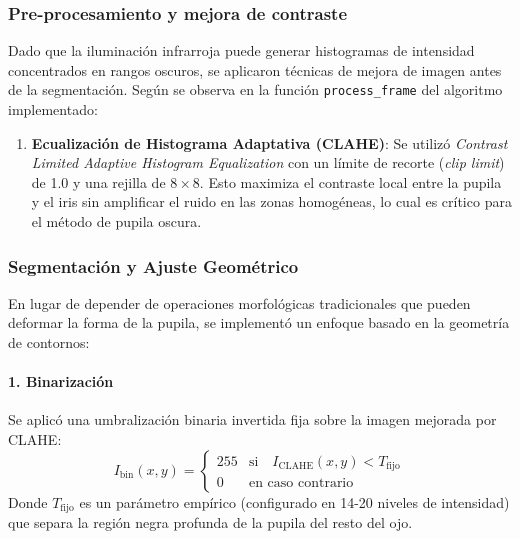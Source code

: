 \subsubsection{Pre-procesamiento y mejora de contraste}

Dado que la iluminación infrarroja puede generar histogramas de intensidad concentrados en rangos oscuros, se aplicaron técnicas de mejora de imagen antes de la segmentación.
Según se observa en la función \texttt{process\_frame} del algoritmo implementado:

\begin{enumerate}
	\item \textbf{Ecualización de Histograma Adaptativa (CLAHE)}: Se utilizó \textit{Contrast Limited Adaptive Histogram Equalization} con un límite de recorte (\textit{clip limit}) de 1.0 y una rejilla de $8 \times 8$.
	Esto maximiza el contraste local entre la pupila y el iris sin amplificar el ruido en las zonas homogéneas, lo cual es crítico para el método de pupila oscura.
\end{enumerate}

\subsubsection{Segmentación y Ajuste Geométrico}

En lugar de depender de operaciones morfológicas tradicionales que pueden deformar la forma de la pupila, se implementó un enfoque basado en la geometría de contornos:

\paragraph{1. Binarización}
Se aplicó una umbralización binaria invertida fija sobre la imagen mejorada por CLAHE:
\begin{equation}
	I_{\text{bin}}(x, y) = \begin{cases}
		255 & \text{si}\quad I_{\text{CLAHE}}(x, y) < T_{\text{fijo}} \\
		0 & \text{en caso contrario}
	\end{cases}
\end{equation}
Donde $T_{\text{fijo}}$ es un parámetro empírico (configurado en 14-20 niveles de intensidad) que separa la región negra profunda de la pupila del resto del ojo.

